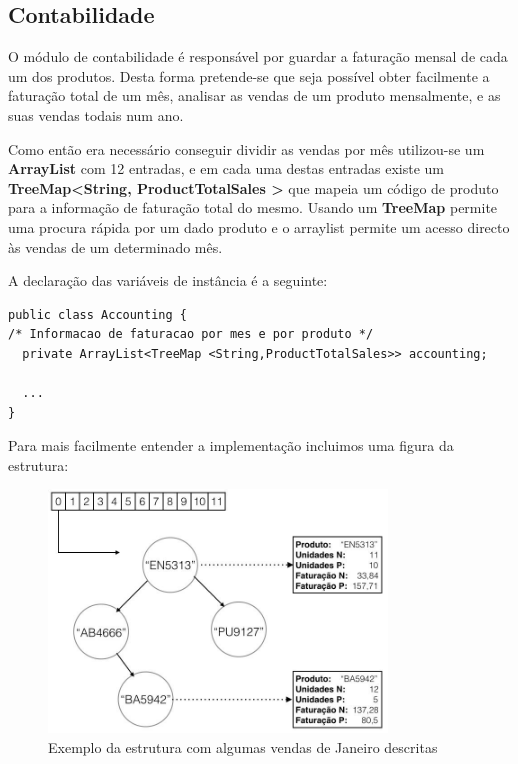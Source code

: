 \documentclass[10pt] {article}
\begin{document}
\subsection{Contabilidade}

O módulo de contabilidade é responsável por guardar a faturação mensal de cada um dos produtos.
Desta forma pretende-se que seja possível obter facilmente a faturação total de um mês, analisar as vendas de um produto mensalmente, e as suas vendas todais num ano.

Como então era necessário conseguir dividir as vendas por mês utilizou-se um\color{blue} \textbf{ArrayList} \color{black} com 
12 entradas, e em cada uma destas entradas existe um \color{blue} \textbf{TreeMap\textless String, ProductTotalSales
\textgreater} \color{black} que mapeia um código de produto para a informação de faturação total do mesmo.
Usando um \color{blue} \textbf{TreeMap} \color{black} permite uma procura rápida por um dado produto e o arraylist permite um 
acesso directo às vendas de um determinado mês.

A declaração das variáveis de instância é a seguinte:

\begin{lstlisting}
public class Accounting {
/* Informacao de faturacao por mes e por produto */
  private ArrayList<TreeMap <String,ProductTotalSales>> accounting;

  ...
}

\end{lstlisting}

Para mais facilmente entender a implementação incluimos uma figura da estrutura:

\begin{figure}[ht!]
\centering
\includegraphics[width=90mm]{accounting.jpg}
\caption{Exemplo da estrutura com algumas vendas de Janeiro descritas}
\label{fig:sales}
\end{figure}
\end{document}
